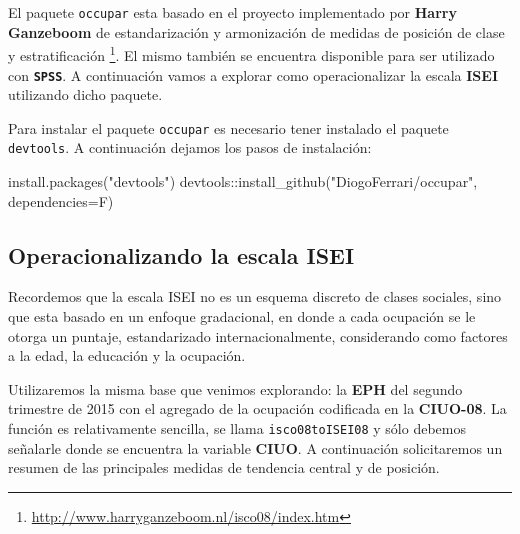 \documentclass[
]{book}
\newenvironment{Shaded}{\begin{snugshade}}{\end{snugshade}}
\newcommand{\AttributeTok}[1]{\textcolor[rgb]{0.77,0.63,0.00}{#1}}
\newcommand{\FunctionTok}[1]{\textcolor[rgb]{0.00,0.00,0.00}{#1}}
\newcommand{\NormalTok}[1]{#1}
\newcommand{\OtherTok}[1]{\textcolor[rgb]{0.56,0.35,0.01}{#1}}
\newcommand{\SpecialCharTok}[1]{\textcolor[rgb]{0.00,0.00,0.00}{#1}}
\newcommand{\StringTok}[1]{\textcolor[rgb]{0.31,0.60,0.02}{#1}}
\begin{document}
El paquete \texttt{occupar} esta basado en el proyecto implementado por \textbf{Harry Ganzeboom} de estandarización y armonización de medidas de posición de clase y estratificación \footnote{\url{http://www.harryganzeboom.nl/isco08/index.htm}}. El mismo también se encuentra disponible para ser utilizado con \textbf{\texttt{SPSS}}. A continuación vamos a explorar como operacionalizar la escala \textbf{ISEI} utilizando dicho paquete.

Para instalar el paquete \texttt{occupar} es necesario tener instalado el paquete \texttt{devtools}. A continuación dejamos los pasos de instalación:

\begin{Shaded}
\begin{Highlighting}[]
\FunctionTok{install.packages}\NormalTok{(}\StringTok{"devtools"}\NormalTok{)}
\NormalTok{devtools}\SpecialCharTok{::}\FunctionTok{install\_github}\NormalTok{(}\StringTok{"DiogoFerrari/occupar"}\NormalTok{, }\AttributeTok{dependencies=}\NormalTok{F)}
\end{Highlighting}
\end{Shaded}

\hypertarget{operacionalizando-la-escala-isei}{%
\subsection{Operacionalizando la escala ISEI}\label{operacionalizando-la-escala-isei}}

Recordemos que la escala ISEI no es un esquema discreto de clases sociales, sino que esta basado en un enfoque gradacional, en donde a cada ocupación se le otorga un puntaje, estandarizado internacionalmente, considerando como factores a la edad, la educación y la ocupación.

Utilizaremos la misma base que venimos explorando: la \textbf{EPH} del segundo trimestre de 2015 con el agregado de la ocupación codificada en la \textbf{CIUO-08}. La función es relativamente sencilla, se llama \texttt{isco08toISEI08} y sólo debemos señalarle donde se encuentra la variable \textbf{CIUO}. A continuación solicitaremos un resumen de las principales medidas de tendencia central y de posición.

\begin{Shaded}
\end{Shaded}
\end{document}
